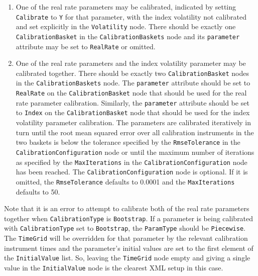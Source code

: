 \documentclass[12pt, a4paper]{article}
\begin{document}
{{\begin{enumerate}
\item
One of the real rate parameters may be calibrated, indicated by setting \lstinline!Calibrate! to \lstinline!Y! for that parameter, with the index volatility not calibrated and set 
explicitly in the \lstinline!Volatility! node. There should be exactly one \lstinline!CalibrationBasket! in the \lstinline!CalibrationBaskets! node and its \lstinline!parameter! 
attribute may be set to \lstinline!RealRate! or omitted.

\item
One of the real rate parameters and the index volatility parameter may be calibrated together. There should be exactly two \lstinline!CalibrationBasket! nodes in the \lstinline!CalibrationBaskets! 
node. The \lstinline!parameter! attribute should be set to \lstinline!RealRate! on the \lstinline!CalibrationBasket! node that should be used for the real rate parameter calibration. 
Similarly, the \lstinline!parameter! attribute should be set to \lstinline!Index! on the \lstinline!CalibrationBasket! node that should be used for the index volatility parameter calibration. 
The parameters are calibrated iteratively in turn until the root mean squared error over all calibration instruments in the two baskets is below the tolerance specified by the 
\lstinline!RmseTolerance! in the \lstinline!CalibrationConfiguration! node or until the maximum number of iterations as specified by the \lstinline!MaxIterations! in the 
\lstinline!CalibrationConfiguration! node has been reached. The \lstinline!CalibrationConfiguration! node is optional. If it is omitted, the \lstinline!RmseTolerance! defaults to 0.0001 and the 
\lstinline!MaxIterations! defaults to 50.

\end{enumerate}

Note that it is an error to attempt to calibrate both of the real rate parameters together when \lstinline!CalibrationType! is \lstinline!Bootstrap!. If a parameter is being calibrated 
with \lstinline!CalibrationType! set to \lstinline!Bootstrap!, the \lstinline!ParamType! should be \lstinline!Piecewise!. The \lstinline!TimeGrid! will be overridden for that parameter by 
the relevant calibration instrument times and the parameter's initial values are set to the first element of the \lstinline!InitialValue! list. So, leaving the \lstinline!TimeGrid! node 
empty and giving a single value in the \lstinline!InitialValue! node is the clearest XML setup in this case.

}}
\end{document}
